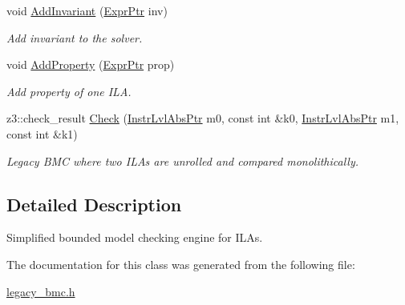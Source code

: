 \begin{DoxyCompactItemize}
void \mbox{\hyperlink{classilang_1_1_legacy_bmc_a0e3603ca99e51e0d12786ce2386110e6}{Add\+Invariant}} (\mbox{\hyperlink{namespaceilang_a7c4196c72e53ea4df4b7861af7bc3bce}{Expr\+Ptr}} inv)
\begin{DoxyCompactList}\small\item\em Add invariant to the solver. \end{DoxyCompactList}\item 
\mbox{\label{classilang_1_1_legacy_bmc_a4d096b7db72d448163865b78449324db}} 
void \mbox{\hyperlink{classilang_1_1_legacy_bmc_a4d096b7db72d448163865b78449324db}{Add\+Property}} (\mbox{\hyperlink{namespaceilang_a7c4196c72e53ea4df4b7861af7bc3bce}{Expr\+Ptr}} prop)
\begin{DoxyCompactList}\small\item\em Add property of one I\+LA. \end{DoxyCompactList}\item 
\mbox{\label{classilang_1_1_legacy_bmc_af52a74ba7df5fe3b7bc3d3c0a9b82789}} 
z3\+::check\+\_\+result \mbox{\hyperlink{classilang_1_1_legacy_bmc_af52a74ba7df5fe3b7bc3d3c0a9b82789}{Check}} (\mbox{\hyperlink{namespaceilang_ad1b30fdf347e493b3937143da05d1a72}{Instr\+Lvl\+Abs\+Ptr}} m0, const int \&k0, \mbox{\hyperlink{namespaceilang_ad1b30fdf347e493b3937143da05d1a72}{Instr\+Lvl\+Abs\+Ptr}} m1, const int \&k1)
\begin{DoxyCompactList}\small\item\em Legacy B\+MC where two I\+L\+As are unrolled and compared monolithically. \end{DoxyCompactList}\end{DoxyCompactItemize}


\subsection{Detailed Description}
Simplified bounded model checking engine for I\+L\+As. 

The documentation for this class was generated from the following file\+:\begin{DoxyCompactItemize}
\item 
\mbox{\hyperlink{legacy__bmc_8h}{legacy\+\_\+bmc.\+h}}\end{DoxyCompactItemize}
